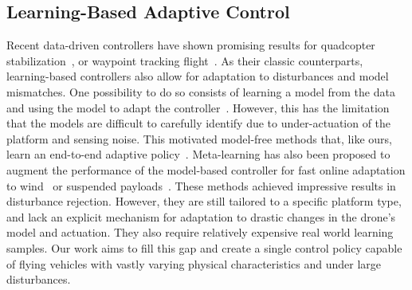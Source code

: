 


\subsection{Learning-Based Adaptive Control}

Recent data-driven controllers have shown promising results for quadcopter stabilization~\cite{hwangbo2017control,koch2019reinforcement}, or waypoint tracking flight~\cite{song2021autonomous, kaufmann2022benchmark}.
%
As their classic counterparts, learning-based controllers also allow for adaptation to disturbances and model mismatches.
%
One possibility to do so consists of learning a model from the data and using the model to adapt the controller~\cite{lambert2019low,shi2019neural,belkhale2021model,torrente2021data}.
%
However, this has the limitation that the models are difficult to carefully identify due to under-actuation of the platform and sensing noise.
%
This motivated model-free methods that, like ours, learn an end-to-end adaptive policy~\cite{pi2021robust}.
%
Meta-learning has also been proposed to augment the performance of the model-based controller for fast online adaptation to wind~\cite{neuralfly} or suspended payloads~\cite{belkhale2021model}. 
%
These methods achieved impressive results in disturbance rejection.
%
However, they are still tailored to a specific platform type, and lack an explicit mechanism for adaptation to drastic changes in the drone's model and actuation. They also require relatively expensive real world learning samples. 
%
Our work aims to fill this gap and create a single control policy capable of flying vehicles with vastly varying physical characteristics and under large disturbances.
%





